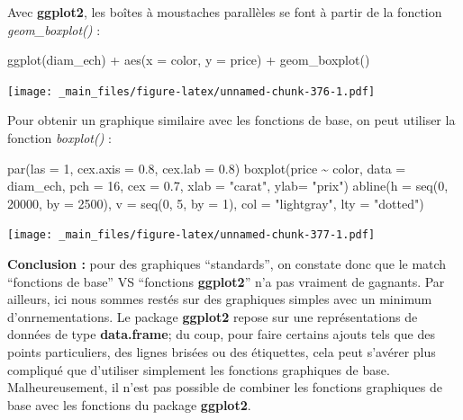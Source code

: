 \documentclass[
]{book}
\newenvironment{Shaded}{\begin{snugshade}}{\end{snugshade}}
\newcommand{\AttributeTok}[1]{\textcolor[rgb]{0.77,0.63,0.00}{#1}}
\newcommand{\DecValTok}[1]{\textcolor[rgb]{0.00,0.00,0.81}{#1}}
\newcommand{\FloatTok}[1]{\textcolor[rgb]{0.00,0.00,0.81}{#1}}
\newcommand{\FunctionTok}[1]{\textcolor[rgb]{0.00,0.00,0.00}{#1}}
\newcommand{\NormalTok}[1]{#1}
\newcommand{\SpecialCharTok}[1]{\textcolor[rgb]{0.00,0.00,0.00}{#1}}
\newcommand{\StringTok}[1]{\textcolor[rgb]{0.31,0.60,0.02}{#1}}
\theoremstyle{definition}
\theoremstyle{definition}
\theoremstyle{definition}
\theoremstyle{definition}
\theoremstyle{remark}
\begin{document}
Avec \textbf{ggplot2}, les boîtes à moustaches parallèles se font à partir de la fonction \emph{geom\_boxplot()} :

\begin{Shaded}
\begin{Highlighting}[]
\FunctionTok{ggplot}\NormalTok{(diam\_ech) }\SpecialCharTok{+}              
  \FunctionTok{aes}\NormalTok{(}\AttributeTok{x =}\NormalTok{ color, }\AttributeTok{y =}\NormalTok{ price) }\SpecialCharTok{+}  
  \FunctionTok{geom\_boxplot}\NormalTok{() }
\end{Highlighting}
\end{Shaded}

\texttt{[image: \_main\_files/figure-latex/unnamed-chunk-376-1.pdf]}

Pour obtenir un graphique similaire avec les fonctions de base, on peut utiliser la fonction \emph{boxplot()} :

\begin{Shaded}
\begin{Highlighting}[]
\FunctionTok{par}\NormalTok{(}\AttributeTok{las =} \DecValTok{1}\NormalTok{, }\AttributeTok{cex.axis =} \FloatTok{0.8}\NormalTok{, }\AttributeTok{cex.lab =} \FloatTok{0.8}\NormalTok{)}
\FunctionTok{boxplot}\NormalTok{(price }\SpecialCharTok{\textasciitilde{}}\NormalTok{ color, }\AttributeTok{data =}\NormalTok{ diam\_ech, }\AttributeTok{pch =} \DecValTok{16}\NormalTok{, }\AttributeTok{cex =} \FloatTok{0.7}\NormalTok{, }
     \AttributeTok{xlab =} \StringTok{"carat"}\NormalTok{, }\AttributeTok{ylab=} \StringTok{"prix"}\NormalTok{)}
\FunctionTok{abline}\NormalTok{(}\AttributeTok{h =} \FunctionTok{seq}\NormalTok{(}\DecValTok{0}\NormalTok{, }\DecValTok{20000}\NormalTok{, }\AttributeTok{by =} \DecValTok{2500}\NormalTok{), }
       \AttributeTok{v =} \FunctionTok{seq}\NormalTok{(}\DecValTok{0}\NormalTok{, }\DecValTok{5}\NormalTok{, }\AttributeTok{by =} \DecValTok{1}\NormalTok{), }
       \AttributeTok{col =} \StringTok{"lightgray"}\NormalTok{, }\AttributeTok{lty =} \StringTok{"dotted"}\NormalTok{)}
\end{Highlighting}
\end{Shaded}

\texttt{[image: \_main\_files/figure-latex/unnamed-chunk-377-1.pdf]}

\textbf{Conclusion :} pour des graphiques ``standards'', on constate donc que le match ``fonctions de base'' VS ``fonctions \textbf{ggplot2}'' n'a pas vraiment de gagnants. Par ailleurs, ici nous sommes restés sur des graphiques simples avec un minimum d'onrnementations. Le package \textbf{ggplot2} repose sur une représentations de données de type \textbf{data.frame}; du coup, pour faire certains ajouts tels que des points particuliers, des lignes brisées ou des étiquettes, cela peut s'avérer plus compliqué que d'utiliser simplement les fonctions graphiques de base. Malheureusement, il n'est pas possible de combiner les fonctions graphiques de base avec les fonctions du package \textbf{ggplot2}.
\end{document}
